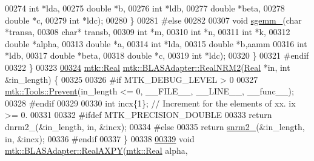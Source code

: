 \begin{DoxyCode}
00274             \textcolor{keywordtype}{int} *lda,
00275             \textcolor{keywordtype}{double} *b,
00276             \textcolor{keywordtype}{int} *ldb,
00277             \textcolor{keywordtype}{double} *beta,
00278             \textcolor{keywordtype}{double} *c,
00279             \textcolor{keywordtype}{int} *ldc);
00280 \}
00281 \textcolor{preprocessor}{#else}
00282 
00307 \textcolor{keywordtype}{void} \hyperlink{namespacemtk_adb7c0560326b8e57f255e58b87ec76b0}{sgemm\_}(\textcolor{keywordtype}{char} *transa,
00308             \textcolor{keywordtype}{char}* transb,
00309             \textcolor{keywordtype}{int} *m,
00310             \textcolor{keywordtype}{int} *n,
00311             \textcolor{keywordtype}{int} *k,
00312             \textcolor{keywordtype}{double} *alpha,
00313             \textcolor{keywordtype}{double} *a,
00314             \textcolor{keywordtype}{int} *lda,
00315             \textcolor{keywordtype}{double} *b,aamm
00316             \textcolor{keywordtype}{int} *ldb,
00317             \textcolor{keywordtype}{double} *beta,
00318             \textcolor{keywordtype}{double} *c,
00319             \textcolor{keywordtype}{int} *ldc);
00320 \}
00321 \textcolor{preprocessor}{#endif}
00322 \}
00323 
\hypertarget{mtk__blas__adapter_8cc_source_l00324}{}\hyperlink{classmtk_1_1BLASAdapter_ab92440888b730863244c5d9479c11aca}{00324} \hyperlink{group__c01-roots_gac080bbbf5cbb5502c9f00405f894857d}{mtk::Real} \hyperlink{classmtk_1_1BLASAdapter_ab92440888b730863244c5d9479c11aca}{mtk::BLASAdapter::RealNRM2}(\hyperlink{group__c01-roots_gac080bbbf5cbb5502c9f00405f894857d}{Real} *in, \textcolor{keywordtype}{int} &in\_length) \{
00325 
00326 \textcolor{preprocessor}{  #if MTK\_DEBUG\_LEVEL > 0}
00327   \hyperlink{classmtk_1_1Tools_afe5bb096309258e2e72503fd7b41c7e0}{mtk::Tools::Prevent}(in\_length <= 0, \_\_FILE\_\_, \_\_LINE\_\_, \_\_func\_\_);
00328 \textcolor{preprocessor}{  #endif}
00329 
00330   \textcolor{keywordtype}{int} incx\{1\};  \textcolor{comment}{// Increment for the elements of xx. ix >= 0.}
00331 
00332 \textcolor{preprocessor}{  #ifdef MTK\_PRECISION\_DOUBLE}
00333   \textcolor{keywordflow}{return} dnrm2\_(&in\_length, in, &incx);
00334 \textcolor{preprocessor}{  #else}
00335   \textcolor{keywordflow}{return} \hyperlink{namespacemtk_a508e99fcb14d526bc43aa0a80aa4b658}{snrm2\_}(&in\_length, in, &incx);
00336 \textcolor{preprocessor}{  #endif}
00337 \}
00338 
\hypertarget{mtk__blas__adapter_8cc_source_l00339}{}\hyperlink{classmtk_1_1BLASAdapter_a081cd092ae65e730f44eae8643edd539}{00339} \textcolor{keywordtype}{void} \hyperlink{classmtk_1_1BLASAdapter_a081cd092ae65e730f44eae8643edd539}{mtk::BLASAdapter::RealAXPY}(\hyperlink{group__c01-roots_gac080bbbf5cbb5502c9f00405f894857d}{mtk::Real} alpha,

\end{DoxyCode}
